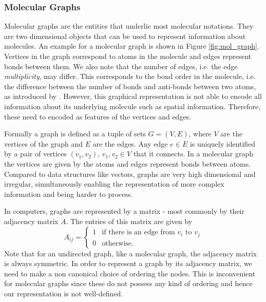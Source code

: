 \subsubsection{Molecular Graphs}
Molecular graphs are the entities that underlie most molecular notations. They are two dimensional objects that can be used to represent information about molecules. An example for a molecular graph is shown in Figure \ref{fig:mol_graph}. Vertices in the graph correspond to atoms in the molecule and edges represent bonds between them. We also note that the number of edges, i.e. the edge \emph{multiplicity}, may differ. This corresponds to the bond order in the molecule, i.e. the difference between the number of bonds and anti-bonds between two atoms, as introduced by \cite{pauling}. However, this graphical representation is not able to encode all information about its underlying molecule such as spatial information. Therefore, these need to encoded as features of the vertices and edges.

Formally a graph is defined as a tuple of sets $G = (V,E)$, where $V$ are the vertices of the graph and $E$ are the edges. Any edge $e \in E$ is uniquely identified by a pair of vertices $(v_1, v_2), \, v_1, v_2 \in V$ that it connects. In a molecular graph the vertices are given by the atoms and edges represent bonds between atoms. Compared to data structures like vectors, graphs are very high dimensional and irregular, simultaneously enabling the representation of more complex information and being harder to process.

In computers, graphs are represented by a matrix - most commonly by their adjacency matrix $A$. The entries of this matrix are given by 
\begin{equation}
	A_{ij} = 
	\begin{cases}
		1 & \text{if there is an edge from } v_i \text{ to } v_j \\
		0 & \text{otherwise.}
	\end{cases}
\end{equation}
Note that for an undirected graph, like a molecular graph, the adjacency matrix is always symmetric. In order to represent a graph by its adjacency matrix, we need to make a non canonical choice of ordering the nodes. This is inconvenient for molecular graphs since these do not possess any kind of ordering and hence our representation is not well-defined. 

